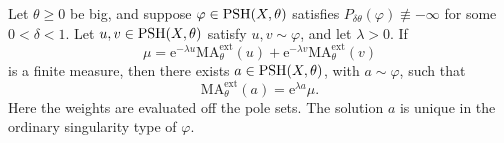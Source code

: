 \begin{theorem}\label{thm:weighted-measure-addition}
Let $\theta\geq0$ be big, and suppose $\varphi\in\mathrm{PSH}(X,\theta)$ satisfies $P_{\delta\theta}(\varphi)\not\equiv-\infty$ for some $0<\delta<1$. Let $u,v\in\mathrm{PSH}(X,\theta)$ satisfy $u,v\sim\varphi$, and let $\lambda>0$. If
\[
 \mu=\mathrm{e}^{-\lambda u}\mathrm{MA}^{\mathrm{ext}}_\theta(u)
       +\mathrm{e}^{-\lambda v}\mathrm{MA}^{\mathrm{ext}}_\theta(v)
\]
is a finite measure, then there exists $a\in\mathrm{PSH}(X,\theta)$, with $a\sim\varphi$, such that
\[
 \mathrm{MA}^{\mathrm{ext}}_\theta(a)=\mathrm{e}^{\lambda a}\mu.
\]
Here the weights are evaluated off the pole sets. The solution $a$ is unique in the ordinary singularity type of $\varphi$.
\end{theorem}
